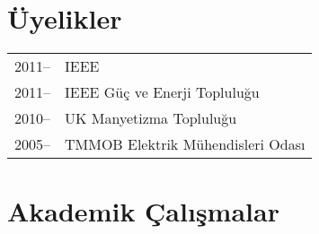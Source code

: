 \documentclass[a4paper,12pt]{article}
\begin{document}


\section{Üyelikler}
\begin{tabular}{ll}
2011-- & IEEE\\
2011-- & IEEE Güç ve Enerji Topluluğu\\
2010-- & UK Manyetizma Topluluğu\\
2005-- & TMMOB Elektrik Mühendisleri Odası\\
\end{tabular}

\section{Akademik Çalışmalar}
\end{document}
